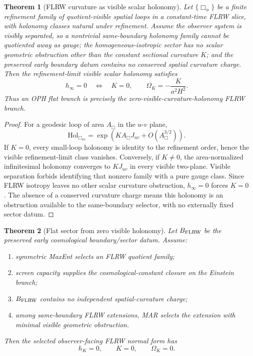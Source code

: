 \documentclass[11pt]{article}
\newtheorem{theorem}{Theorem}[section]
\newcommand{\Hol}{\mathrm{Hol}}
\begin{document}
\begin{theorem}[FLRW curvature as visible scalar holonomy]\label{thm:flrw-curvature-holonomy}
Let \(\{\Box_\alpha\}\) be a finite refinement family of quotient-visible spatial loops in a
constant-time FLRW slice, with holonomy classes natural under refinement. Assume the observer system
is visibly separated, so a nontrivial same-boundary holonomy family cannot be quotiented away as
gauge; the homogeneous-isotropic sector has no scalar geometric obstruction other than the constant
sectional curvature \(K\); and the preserved early boundary datum contains no conserved spatial
curvature charge. Then the refinement-limit visible scalar holonomy satisfies
\[
h_\infty=0
\quad\Longleftrightarrow\quad
K=0,
\qquad
\Omega_K=-\frac{K}{a^2H^2}.
\]
Thus an OPH flat branch is precisely the zero-visible-curvature-holonomy FLRW branch.
\end{theorem}

\begin{proof}
For a geodesic loop of area \(A_\Box\) in the \(u\)-\(v\) plane,
\[
\Hol_{\Box_{uv}}
=
\exp\!\left(KA_\Box J_{uv}+O(A_\Box^{3/2})\right).
\]
If \(K=0\), every small-loop holonomy is identity to the refinement order, hence the visible
refinement-limit class vanishes. Conversely, if \(K\ne0\), the area-normalized infinitesimal
holonomy converges to \(KJ_{uv}\) in every visible two-plane. Visible separation forbids identifying
that nonzero family with a pure gauge class. Since FLRW isotropy leaves no other scalar curvature
obstruction, \(h_\infty=0\) forces \(K=0\). The absence of a conserved curvature charge means this
holonomy is an obstruction available to the same-boundary selector, with no externally fixed sector
datum.
\end{proof}

\begin{theorem}[Flat sector from zero visible holonomy]\label{thm:flat-sector}
Let \(B_{\rm FLRW}\) be the preserved early cosmological boundary/sector datum. Assume:
\begin{enumerate}[leftmargin=2em]
\item symmetric MaxEnt selects an FLRW quotient family;
\item screen capacity supplies the cosmological-constant closure on the Einstein branch;
\item \(B_{\rm FLRW}\) contains no independent spatial-curvature charge;
\item among same-boundary FLRW extensions, MAR selects the extension with minimal visible geometric
obstruction.
\end{enumerate}
Then the selected observer-facing FLRW normal form has
\[
h_K=0,\qquad K=0,\qquad \Omega_K=0.
\]
\end{theorem}
\end{document}
